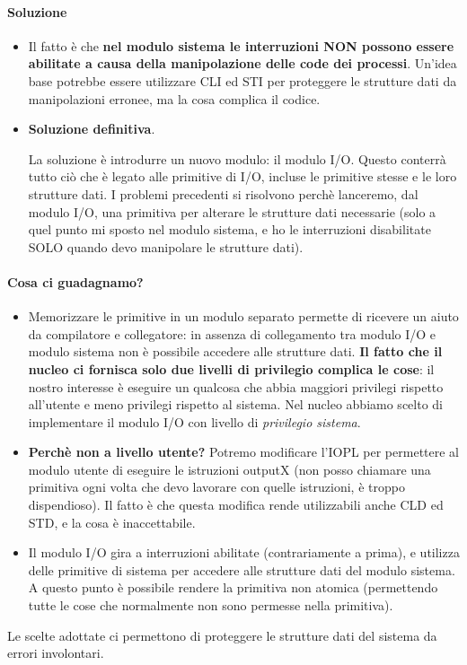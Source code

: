 \paragraph{Soluzione} 
\begin{itemize}
	\item Il fatto è che \textbf{nel modulo sistema le interruzioni NON possono essere abilitate a causa della manipolazione delle code dei processi}. Un'idea base potrebbe essere utilizzare CLI ed STI per proteggere le strutture dati da manipolazioni erronee, ma la cosa complica il codice.
	\item \textbf{Soluzione definitiva}. 
	
	La soluzione è introdurre un nuovo modulo: il modulo I/O. Questo conterrà tutto ciò che è legato alle primitive di I/O, incluse le primitive stesse e le loro strutture dati. I problemi precedenti si risolvono perchè lanceremo, dal modulo I/O, una primitiva per alterare le strutture dati necessarie (solo a quel punto mi sposto nel modulo sistema, e ho le interruzioni disabilitate SOLO quando devo manipolare le strutture dati).
\end{itemize}
\paragraph{Cosa ci guadagnamo?}
\begin{itemize}
	\item Memorizzare le primitive in un modulo separato permette di ricevere un aiuto da compilatore e collegatore: in assenza di collegamento tra modulo I/O e modulo sistema non è possibile accedere alle strutture dati. \textbf{Il fatto che il nucleo ci fornisca solo due livelli di privilegio complica le cose}: il nostro interesse è eseguire un qualcosa che abbia maggiori privilegi rispetto all'utente e meno privilegi rispetto al sistema. Nel nucleo abbiamo scelto di implementare il modulo I/O con livello di \textit{privilegio sistema}. 
	\item \textbf{Perchè non a livello utente?} Potremo modificare l'IOPL per permettere al modulo utente di eseguire le istruzioni outputX (non posso chiamare una primitiva ogni volta che devo lavorare con quelle istruzioni, è troppo dispendioso). Il fatto è che questa modifica rende utilizzabili anche CLD ed STD, e la cosa è inaccettabile.
	\item Il modulo I/O gira a interruzioni abilitate (contrariamente a prima), e utilizza delle primitive di sistema per accedere alle strutture dati del modulo sistema. A questo punto è possibile rendere la primitiva non atomica (permettendo tutte le cose che normalmente non sono permesse nella primitiva). 
\end{itemize}
Le scelte adottate ci permettono di proteggere le strutture dati del sistema da errori involontari. 

